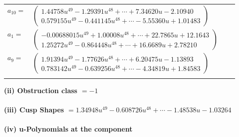 \documentclass[1p]{elsarticle_modified}
\theoremstyle{definition}
\begin{document}
\begin{tabular}{m{7pt} m{180pt} m{7pt} m{180pt} }
\flushright $a_{10}=$&$\begin{pmatrix}1.44758 u^{49}-1.29391 u^{48}+\cdots+7.34620 u-2.10940\\0.579155 u^{49}-0.441145 u^{48}+\cdots-5.55360 u+1.01483\end{pmatrix}$ \\
\flushright $a_{1}=$&$\begin{pmatrix}-0.00688015 u^{49}+1.00008 u^{48}+\cdots+22.7865 u+12.1643\\1.25272 u^{49}-0.864448 u^{48}+\cdots+16.6689 u+2.78210\end{pmatrix}$ \\
\flushright $a_{9}=$&$\begin{pmatrix}1.91394 u^{49}-1.77626 u^{48}+\cdots+6.20475 u-1.13893\\0.783142 u^{49}-0.639256 u^{48}+\cdots-4.34819 u+1.84583\end{pmatrix}$\\&\end{tabular}
\flushleft \textbf{(ii) Obstruction class $= -1$}\\~\\
\flushleft \textbf{(iii) Cusp Shapes $= 1.34948 u^{49}-0.608726 u^{48}+\cdots-1.48538 u-1.03264$}\\~\\
\newpage\renewcommand{\arraystretch}{1}
\flushleft \textbf{(iv) u-Polynomials at the component}\newline \\
\end{document}
